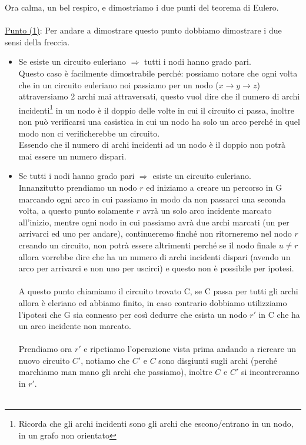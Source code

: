 \begin{demostration}
Ora calma, un bel respiro, e dimostriamo i due punti del teorema di Eulero.\\\\
\underline{Punto (1)}: Per andare a dimostrare questo punto dobbiamo dimostrare i due sensi della freccia.
\begin{itemize}
    \item Se esiste un circuito euleriano $\Longrightarrow$ tutti i nodi hanno grado pari.\\
    Questo caso è facilmente dimostrabile perché: possiamo notare che ogni volta che in un circuito euleriano noi passiamo per un nodo ($x \to y \to z$) attraversiamo 2 archi mai attraversati, questo vuol dire che il numero di archi incidenti\footnote{Ricorda che gli archi incidenti sono gli archi che escono/entrano in un nodo, in un grafo non orientato} in un nodo è il doppio delle volte in cui il circuito ci passa, inoltre non può verificarsi una casistica in cui un nodo ha solo un arco perché in quel modo non ci verificherebbe un circuito.\\ Essendo che il numero di archi incidenti ad un nodo è il doppio non potrà mai essere un numero dispari.
    \item Se tutti i nodi hanno grado pari $\Longrightarrow$ esiste un circuito euleriano.\\
    Innanzitutto prendiamo un nodo $r$ ed iniziamo a creare un percorso in G marcando ogni arco in cui passiamo in modo da non passarci una seconda volta, a questo punto solamente $r$ avrà un solo arco incidente marcato all'inizio, mentre ogni nodo in cui passiamo avrà due archi marcati (un per arrivarci ed uno per andare), continueremo finché non ritorneremo nel nodo $r$ creando un circuito, non potrà essere altrimenti perché se il nodo finale $u \neq r$ allora vorrebbe dire che ha un numero di archi incidenti dispari (avendo un arco per arrivarci e non uno per uscirci) e questo non è possibile per ipotesi.\\\\
    A questo punto chiamiamo il circuito trovato C, se C passa per tutti gli archi allora è eleriano ed abbiamo finito, in caso contrario dobbiamo utilizziamo l'ipotesi che G sia connesso per così dedurre che esista un nodo $r'$ in C che ha un arco incidente non marcato.\\\\ 
    Prendiamo ora $r'$ e ripetiamo l'operazione vista prima andando a ricreare un nuovo circuito $C'$, notiamo che $C'$ e $C$ sono disgiunti sugli archi (perché marchiamo man mano gli archi che passiamo), inoltre $C$ e $C'$ si incontreranno in $r'$. \\\\

\end{itemize}
\end{demostration}
